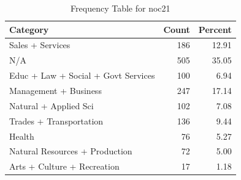\begin{table}[!h]
\centering
\caption{\label{tab:tab:noc21}Frequency Table for noc21}
\centering
\begin{tabular}[t]{lrr}
\toprule
Category & Count & Percent\\
\midrule
Sales + Services & 186 & 12.91\\
N/A & 505 & 35.05\\
Educ + Law + Social + Govt Services & 100 & 6.94\\
Management + Business & 247 & 17.14\\
Natural + Applied Sci & 102 & 7.08\\
\addlinespace
Trades + Transportation & 136 & 9.44\\
Health & 76 & 5.27\\
Natural Resources + Production & 72 & 5.00\\
Arts + Culture + Recreation & 17 & 1.18\\
\bottomrule
\end{tabular}
\end{table}
